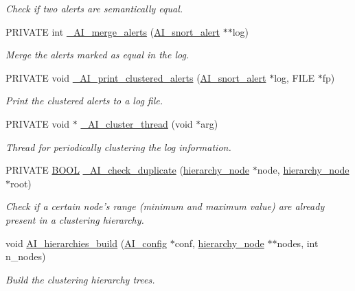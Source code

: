 \begin{DoxyCompactItemize}
\begin{DoxyCompactList}\small\item\em Check if two alerts are semantically equal. \item\end{DoxyCompactList}\item 
PRIVATE int \hyperlink{group__cluster_ga8ce8e5a5d8954672297fa2dedb380dcd}{\_\-AI\_\-merge\_\-alerts} (\hyperlink{struct__AI__snort__alert}{AI\_\-snort\_\-alert} $\ast$$\ast$log)
\begin{DoxyCompactList}\small\item\em Merge the alerts marked as equal in the log. \item\end{DoxyCompactList}\item 
PRIVATE void \hyperlink{group__cluster_ga7d151880080470b542e99643dc0426a7}{\_\-AI\_\-print\_\-clustered\_\-alerts} (\hyperlink{struct__AI__snort__alert}{AI\_\-snort\_\-alert} $\ast$log, FILE $\ast$fp)
\begin{DoxyCompactList}\small\item\em Print the clustered alerts to a log file. \item\end{DoxyCompactList}\item 
PRIVATE void $\ast$ \hyperlink{group__cluster_ga8a5eae61dc9fd0f13e0acdfa5f4478e2}{\_\-AI\_\-cluster\_\-thread} (void $\ast$arg)
\begin{DoxyCompactList}\small\item\em Thread for periodically clustering the log information. \item\end{DoxyCompactList}\item 
PRIVATE \hyperlink{spp__ai_8h_a3e5b8192e7d9ffaf3542f1210aec18dd}{BOOL} \hyperlink{group__cluster_ga29c35cd6c56f54e27b5b190c6d6c487a}{\_\-AI\_\-check\_\-duplicate} (\hyperlink{struct__hierarchy__node}{hierarchy\_\-node} $\ast$node, \hyperlink{struct__hierarchy__node}{hierarchy\_\-node} $\ast$root)
\begin{DoxyCompactList}\small\item\em Check if a certain node's range (minimum and maximum value) are already present in a clustering hierarchy. \item\end{DoxyCompactList}\item 
void \hyperlink{group__cluster_ga1445818b37483f78cc3fb2890155842c}{AI\_\-hierarchies\_\-build} (\hyperlink{structAI__config}{AI\_\-config} $\ast$conf, \hyperlink{struct__hierarchy__node}{hierarchy\_\-node} $\ast$$\ast$nodes, int n\_\-nodes)
\begin{DoxyCompactList}\small\item\em Build the clustering hierarchy trees. \item\end{DoxyCompactList}\end{DoxyCompactItemize}
